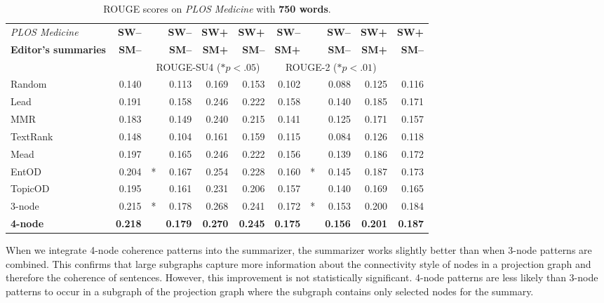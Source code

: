 \begin{table}[!ht]
	\begin{center}
		\begin{tabular}{lr@{}lrrr||r@{}lrrr}
		\toprule
		\emph{PLOS Medicine}& \textbf{SW--}& & \textbf{SW--} & \textbf{SW+} & \textbf{SW+}& \textbf{SW--} & & \textbf{SW--} & \textbf{SW+} & \textbf{SW+} \\
		\textbf{Editor's summaries}  & \textbf{SM--} & & \textbf{SM--} &  \textbf{SM+} & \textbf{SM--} &  \textbf{SM+}  & & \textbf{SM--} &  \textbf{SM+}  & \textbf{SM--} \\
		\midrule
		&& \multicolumn{4}{c||}{ROUGE-SU4 ($\ast p<.05$)} & \multicolumn{4}{c}{ROUGE-2 ($\ast p<.01$)}\\
		\midrule
		Random &  0.140& & 0.113 & 0.169  & 0.153 &  0.102 & & 0.088 & 0.125 & 0.116 \\
		Lead & 0.191 & & 0.158 & 0.246 & 0.222  & 0.158 & & 0.140 &0.185 &0.171   \\
		MMR & 0.183& & 0.149 & 0.240 & 0.215 & 0.141 & & 0.125 & 0.171 &0.157 \\
		TextRank & 0.148& & 0.104 & 0.161 & 0.159 & 0.115 & & 0.084 &0.126 & 0.118\\
		Mead & 0.197 & & 0.165 & 0.246 & 0.222& 0.156 & &0.139 & 0.186 & 0.172 \\
		EntOD & 0.204&* & 0.167 & 0.254& 0.228 &0.160 &* & 0.145 &0.187 & 0.173\\
		TopicOD & 0.195 & &0.161 & 0.231 &0.206 & 0.157 &  & 0.140 &0.169 & 0.165 \\
		3-node &0.215& * &0.178& 0.268& 0.241& 0.172 & * & 0.153 & 0.200 &0.184 \\
		\textbf{4-node} & \textbf{0.218}& & \textbf{0.179} & \textbf{0.270} & \textbf{0.245}  & \textbf{0.175} & & \textbf{0.156} & \textbf{0.201} & \textbf{0.187} \\
		\bottomrule
		\end{tabular}
	\end{center}
	\caption{ROUGE scores on \emph{PLOS Medicine} with \textbf{750 words}.}
	\label{tab:plos-750words}
\end{table}

When we integrate 4-node coherence patterns into the summarizer, the summarizer works slightly better than when 3-node patterns are combined. 
This confirms that large subgraphs capture more information about the connectivity style of nodes in a projection graph and therefore the coherence of sentences.  
However, this improvement is not statistically significant. 
4-node patterns are less likely than 3-node patterns to occur in a subgraph of the projection graph where the subgraph contains only selected nodes for the summary. 

